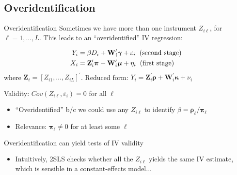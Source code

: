 \documentclass{beamer}
\begin{document}
\subsection{Overidentification}
\begin{frame}{Overidentification}
Sometimes we have more than one instrument $Z_{i\ell}$, for $\ell=1,\dots,L$. This leads to an ``overidentified'' IV regression:

\vspace{-1cm}
\begin{align*}
Y_i &=  \beta D_i +\mathbf{W}_i^\prime\boldsymbol{\gamma} +  \varepsilon_i\hspace{0.2cm}\text{(second stage)}\\
X_i &= \mathbf{Z}_i^\prime\boldsymbol{\pi} + \mathbf{W}_i^\prime\boldsymbol{\mu} + \eta_i\hspace{0.2cm}\text{(first stage)}
\end{align*}
where $\mathbf{Z}_i=[Z_{i1},\dots,Z_{iL}]^\prime$. Reduced form: $Y_i= \mathbf{Z}_i^\prime\boldsymbol{\rho} + \mathbf{W}_i^\prime\boldsymbol{\kappa}+\nu_i $\pause

Validity: $Cov(Z_{i\ell},\varepsilon_i)=0$ for all $\ell$
\begin{itemize}
  \item ``Overidentified'' b/c we could use any $Z_{i\ell}$ to identify $\beta=\boldsymbol{\rho}_\ell/\boldsymbol{\pi}_\ell$\pause
  \item Relevance: $\boldsymbol{\pi}_\ell\neq 0$ for at least some $\ell$
\end{itemize}\pause\medskip

Overidentification can yield tests of IV validity
\begin{itemize}
  \item Intuitively, 2SLS checks whether all the $Z_{i\ell}$ yields the same IV estimate, which is sensible in a constant-effects model...
\end{itemize}
\end{frame}
\end{document}

